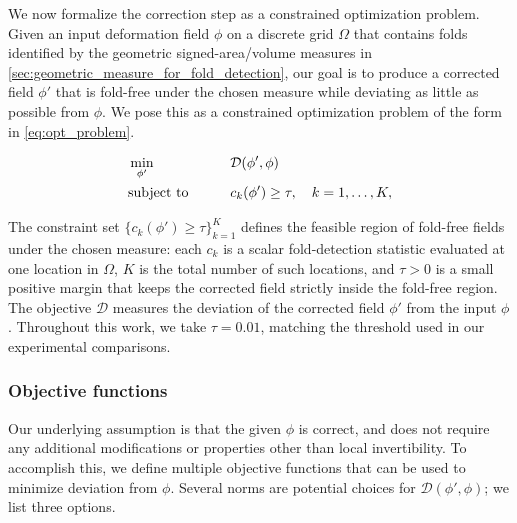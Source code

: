 \documentclass[lettersize,journal]{IEEEtran}
\begin{document}
We now formalize the correction step as a constrained optimization problem. Given an input deformation field $\phi$ on a discrete grid $\Omega$ that contains folds identified by the geometric signed-area/volume measures in \autoref{sec:geometric_measure_for_fold_detection}, our goal is to produce a corrected field $\phi'$ that is fold-free under the chosen measure while deviating as little as possible from $\phi$. We pose this as a constrained optimization problem of the form in \autoref{eq:opt_problem}.

\begin{alignat}{2}
    & \min_{\phi'}            && \quad \mathcal{D}(\phi', \phi) \notag \\
    & \text{subject to} \quad && \quad c_k(\phi') \geq \tau, \quad k = 1, \ldots, K,
    \label{eq:opt_problem}
\end{alignat}

The constraint set $\{c_k(\phi') \geq \tau\}_{k=1}^{K}$ defines the feasible region of fold-free fields under the chosen measure: each $c_k$ is a scalar fold-detection statistic evaluated at one location in $\Omega$, $K$ is the total number of such locations, and $\tau > 0$ is a small positive margin that keeps the corrected field strictly inside the fold-free region. The objective $\mathcal{D}$ measures the deviation of the corrected field $\phi'$ from the input $\phi$. Throughout this work, we take $\tau = 0.01$, matching the threshold used in our experimental comparisons.


\subsubsection{Objective functions}
\label{sec:objective_functions}

Our underlying assumption is that the given $\phi$ is correct, and does not require any additional modifications or properties other than local invertibility. To accomplish this, we define multiple objective functions that can be used to minimize deviation from $\phi$. Several norms are potential choices for $\mathcal{D}(\phi', \phi)$; we list three options.
\end{document}
